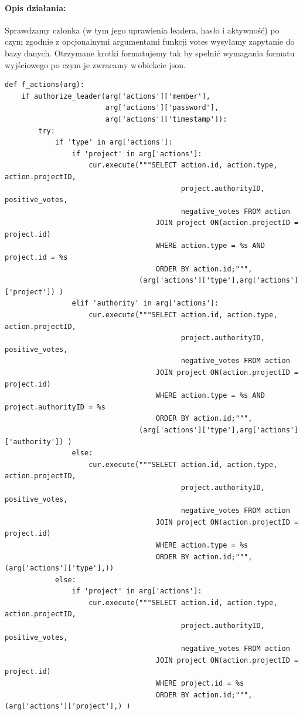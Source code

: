 \documentclass{article}
\begin{document}
\paragraph{Opis działania: }
Sprawdzamy członka (w tym jego uprawienia leadera, hasło i aktywność) po czym zgodnie z opcjonalnymi argumentami funkcji votes wysyłamy zapytanie do bazy danych.
Otrzymane krotki formatujemy tak by spełnić wymagania formatu wyjściowego po czym je zwracamy w\,obiekcie json. \newline
\begin{verbatim}
def f_actions(arg):
    if authorize_leader(arg['actions']['member'], 
                        arg['actions']['password'], 
                        arg['actions']['timestamp']):
        try:
            if 'type' in arg['actions']:
                if 'project' in arg['actions']:
                    cur.execute("""SELECT action.id, action.type, action.projectID,
                                          project.authorityID, positive_votes,
                                          negative_votes FROM action
                                    JOIN project ON(action.projectID = project.id)
                                    WHERE action.type = %s AND project.id = %s
                                    ORDER BY action.id;""",
                                (arg['actions']['type'],arg['actions']['project']) )
                elif 'authority' in arg['actions']:
                    cur.execute("""SELECT action.id, action.type, action.projectID,
                                          project.authorityID, positive_votes,
                                          negative_votes FROM action
                                    JOIN project ON(action.projectID = project.id)
                                    WHERE action.type = %s AND project.authorityID = %s
                                    ORDER BY action.id;""", 
                                (arg['actions']['type'],arg['actions']['authority']) )
                else:
                    cur.execute("""SELECT action.id, action.type, action.projectID,
                                          project.authorityID, positive_votes,
                                          negative_votes FROM action
                                    JOIN project ON(action.projectID = project.id)
                                    WHERE action.type = %s
                                    ORDER BY action.id;""", (arg['actions']['type'],))
            else:
                if 'project' in arg['actions']:
                    cur.execute("""SELECT action.id, action.type, action.projectID,
                                          project.authorityID, positive_votes,
                                          negative_votes FROM action
                                    JOIN project ON(action.projectID = project.id)
                                    WHERE project.id = %s
                                    ORDER BY action.id;""", (arg['actions']['project'],) )




\end{verbatim}
\end{document}

